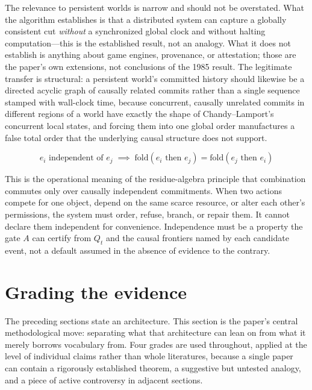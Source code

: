 \documentclass[11pt]{article}
\begin{document}
The relevance to persistent worlds is narrow and should not be overstated. What the algorithm establishes is that a distributed system can capture a globally consistent cut \emph{without} a synchronized global clock and without halting computation---this is the established result, not an analogy. What it does not establish is anything about game engines, provenance, or attestation; those are the paper's own extensions, not conclusions of the 1985 result. The legitimate transfer is structural: a persistent world's committed history should likewise be a directed acyclic graph of causally related commits rather than a single sequence stamped with wall-clock time, because concurrent, causally unrelated commits in different regions of a world have exactly the shape of Chandy--Lamport's concurrent local states, and forcing them into one global order manufactures a false total order that the underlying causal structure does not support.

\[
e_i \text{ independent of } e_j \;\implies\; \mathrm{fold}(e_i \text{ then } e_j) = \mathrm{fold}(e_j \text{ then } e_i)
\]

This is the operational meaning of the residue-algebra principle that combination commutes only over causally independent commitments. When two actions compete for one object, depend on the same scarce resource, or alter each other's permissions, the system must order, refuse, branch, or repair them. It cannot declare them independent for convenience. Independence must be a property the gate $A$ can certify from $Q_t$ and the causal frontiers named by each candidate event, not a default assumed in the absence of evidence to the contrary.

\section{Grading the evidence}
\label{sec:grading}

The preceding sections state an architecture. This section is the paper's central methodological move: separating what that architecture can lean on from what it merely borrows vocabulary from. Four grades are used throughout, applied at the level of individual claims rather than whole literatures, because a single paper can contain a rigorously established theorem, a suggestive but untested analogy, and a piece of active controversy in adjacent sections.
\end{document}
